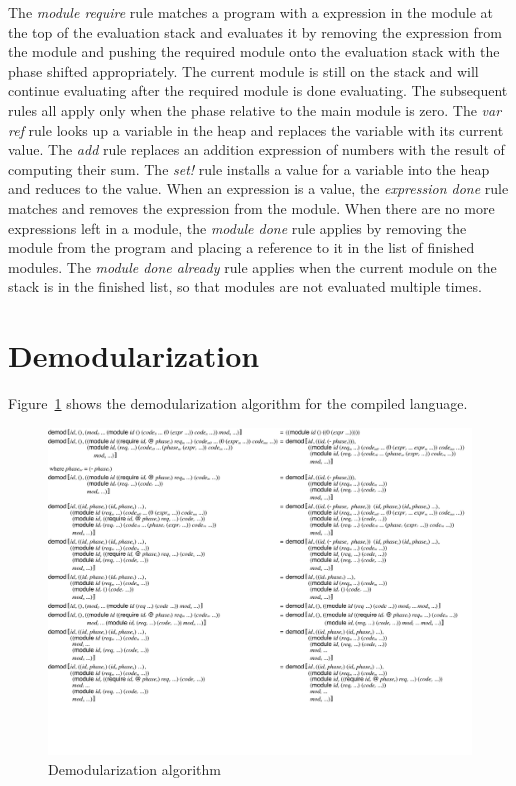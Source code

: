 The \emph{module require} rule matches a program with a  expression in the module at the top of the evaluation stack and evaluates it by removing the  expression from the module and pushing the required module onto the evaluation stack with the phase shifted appropriately.
The current module is still on the stack and will continue evaluating after the required module is done evaluating.
The subsequent rules all apply only when the phase relative to the main module is zero.
The \emph{var ref} rule looks up a variable in the heap and replaces the variable with its current value.
The \emph{add} rule replaces an addition expression of numbers with the result of computing their sum.
The \emph{set!} rule installs a value for a variable into the heap and reduces to the value.
When an expression is a value, the \emph{expression done} rule matches and removes the expression from the module.
When there are no more expressions left in a module, the \emph{module done} rule applies by removing the module from the program and placing a reference to it in the list of finished modules.
The \emph{module done already} rule applies when the current module on the stack is in the finished list, so that modules are not evaluated multiple times. 

\section{Demodularization}

Figure~\ref{fig:demod-redex} shows the demodularization algorithm for the compiled language.

\begin{figure}[h]
\includegraphics[width=\textwidth]{figures/demod-redex}
\caption{Demodularization algorithm}
\label{fig:demod-redex}
\end{figure}


